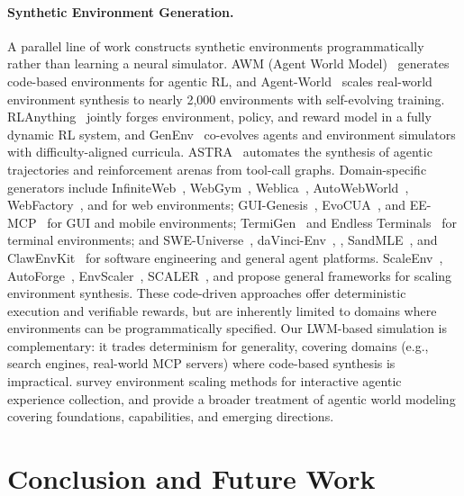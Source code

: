 \documentclass{llmxive}
\begin{document}
\paragraph{Synthetic Environment Generation.}
A parallel line of work constructs synthetic environments programmatically rather than learning a neural simulator.
AWM (Agent World Model)~\citep{wang2026agent} generates code-based environments for agentic RL, and Agent-World~\citep{dong2026agent} scales real-world environment synthesis to nearly 2,000 environments with self-evolving training.
RLAnything~\citep{wang2026rlanything} jointly forges environment, policy, and reward model in a fully dynamic RL system, and GenEnv~\citep{guo2025genenv} co-evolves agents and environment simulators with difficulty-aligned curricula.
ASTRA~\citep{tian2026astra} automates the synthesis of agentic trajectories and reinforcement arenas from tool-call graphs.
Domain-specific generators include InfiniteWeb~\citep{zhang2026infiniteweb}, WebGym~\citep{bai2026webgym}, Weblica~\citep{kar2026weblicascalablereproducibletraining}, AutoWebWorld~\citep{wu2026autowebworld}, WebFactory~\citep{fan2026webfactory}, and \citet{chae2026safe} for web environments; GUI-Genesis~\citep{cao2026gui}, EvoCUA~\citep{xue2026evocua}, and EE-MCP~\citep{he2026ee} for GUI and mobile environments; TermiGen~\citep{zhu2026termigen} and Endless Terminals~\citep{gandhi2026endless} for terminal environments; and SWE-Universe~\citep{chen2026swe}, daVinci-Env~\citep{fu2026davinci}, \citet{zhao2026immersion}, SandMLE~\citep{zhou2026synthetic}, and ClawEnvKit~\citep{li2026clawenvkit} for software engineering and general agent platforms.
ScaleEnv~\citep{tu2026scaleenv}, AutoForge~\citep{cai2025autoforge}, EnvScaler~\citep{song2026envscaler}, SCALER~\citep{xu2026scaler}, and \citet{fang2025towards} propose general frameworks for scaling environment synthesis.
These code-driven approaches offer deterministic execution and verifiable rewards, but are inherently limited to domains where environments can be programmatically specified.
Our LWM-based simulation is complementary: it trades determinism for generality, covering domains (e.g., search engines, real-world MCP servers) where code-based synthesis is impractical.
\citet{huang2025environment} survey environment scaling methods for interactive agentic experience collection, and \citet{chu2026agentic} provide a broader treatment of agentic world modeling covering foundations, capabilities, and emerging directions.

\section{Conclusion and Future Work}
\label{sec:conclusion}
\end{document}
